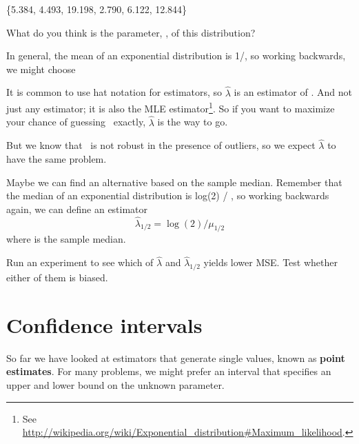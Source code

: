 \documentclass[12pt]{book}
\begin{document}
\{5.384, 4.493, 19.198, 2.790, 6.122, 12.844\}

What do you think is the parameter, \mylambda, of this distribution?

\newcommand{\lamhat}{\hat{\lambda}}
\newcommand{\lamhatmed}{\hat{\lambda}_{1/2}}

In general, the mean of an exponential distribution is 1/\mylambda,
so working backwards, we might choose

\Eqn{ $\lamhat$ = 1 / \myxbar }

It is common to use hat notation for estimators, so $\lamhat$ is an
estimator of \mylambda.  And not just any estimator; it is also the
MLE estimator\footnote{See
\url{http://wikipedia.org/wiki/Exponential_distribution\#Maximum_likelihood}.}.
So if you want to maximize your chance of guessing \mylambda~exactly,
$\lamhat$ is the way to go.

But we know that \myxbar~is not robust in the presence of outliers, so
we expect $\lamhat$ to have the same problem.

Maybe we can find an alternative based on the sample median.  Remember
that the median of an exponential distribution is log(2) / \mylambda,
so working backwards again, we can define an estimator
%
\[ \lamhatmed = \log(2) / \mu_{1/2} \]
%
where \mymu {} is the sample median.

\begin{exercise}
Run an experiment to see which of $\lamhat$ and $\lamhatmed$ yields
lower MSE.  Test whether either of them is biased.


\end{exercise}


\section{Confidence intervals}

So far we have looked at estimators that generate single values, known
as {\bf point estimates}.  For many problems, we might prefer an interval
that specifies an upper and lower bound on the unknown parameter.
\end{document}
